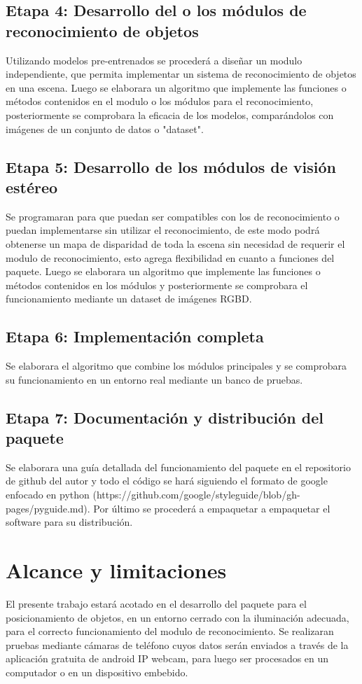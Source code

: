 \documentclass[letterpaper,titlepage,12pt,oneside,spanish,final]{report_eie}
\numberwithin{equation}{chapter}%
\numberwithin{figure}{chapter}%
\numberwithin{table}{chapter}%
\numberwithin{definition}{chapter}%
\numberwithin{lemma}{chapter}%
\numberwithin{theorem}{chapter}%
\numberwithin{corollary}{chapter}%
\numberwithin{condition}{chapter}%
\numberwithin{criterion}{chapter}%
\numberwithin{problem}{chapter}%
\numberwithin{property}{chapter}%
\numberwithin{proposition}{chapter}%
\numberwithin{solution}{chapter}%
\numberwithin{conjecture}{chapter}%
\begin{document}
\subsection*{Etapa 4: Desarrollo del o los módulos de reconocimiento de objetos}
Utilizando modelos pre-entrenados se procederá a diseñar un modulo independiente, que permita implementar un sistema de reconocimiento de objetos en una escena. Luego se elaborara un algoritmo que implemente las funciones o métodos contenidos en el modulo o los módulos para el reconocimiento, posteriormente se comprobara la eficacia de los modelos, comparándolos con imágenes de un conjunto de datos o "dataset".
\subsection*{Etapa 5: Desarrollo de los módulos de visión estéreo}
Se programaran para que puedan ser compatibles con los de reconocimiento o puedan implementarse sin utilizar el reconocimiento, de este modo podrá obtenerse un mapa de disparidad de toda la escena sin necesidad de requerir el modulo de reconocimiento, esto agrega flexibilidad en cuanto a funciones del paquete. Luego se elaborara un algoritmo que implemente las funciones o métodos contenidos en los módulos y posteriormente se comprobara el funcionamiento mediante un dataset de imágenes RGBD.
\subsection*{Etapa 6: Implementación completa}
Se elaborara el algoritmo que combine los módulos principales y se comprobara su funcionamiento en un entorno real mediante un banco de pruebas.
\subsection*{Etapa 7: Documentación y distribución del paquete}
Se elaborara una guía detallada del funcionamiento del paquete en el repositorio de github del autor y todo el código se hará siguiendo el formato de google enfocado en python (https://github.com/google/styleguide/blob/gh-pages/pyguide.md). Por último se procederá a empaquetar a empaquetar el software para su distribución.
\section*{Alcance y limitaciones}
El presente trabajo estará acotado en el desarrollo del paquete para el posicionamiento de objetos, en un entorno cerrado con la iluminación adecuada, para el correcto funcionamiento del modulo de reconocimiento. Se realizaran pruebas mediante cámaras de teléfono cuyos datos serán enviados a través de la aplicación gratuita de android IP webcam, para luego ser procesados en un computador o en un dispositivo embebido.
\end{document}
